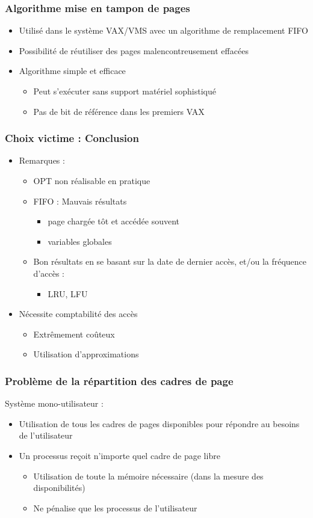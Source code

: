 \begin{frame}
\frametitle{Algorithme mise en tampon de pages}
\begin{itemize}
\item Utilisé dans le système VAX/VMS avec un algorithme de remplacement FIFO
\item Possibilité de réutiliser des pages malencontreusement effacées
\item Algorithme simple et efficace
\begin{itemize}
\item Peut s'exécuter sans support matériel sophistiqué
\item Pas de bit de référence dans les premiers VAX
\end{itemize}
\end{itemize}
\end{frame}

\begin{frame}
\frametitle{Choix victime : Conclusion}
\begin{itemize}
\item Remarques :
\begin{itemize}
\item OPT non réalisable en pratique
\item FIFO : Mauvais résultats
\begin{itemize}
\item page chargée tôt et accédée souvent
\item variables globales
\end{itemize}

\item Bon résultats en se basant sur la date de dernier accès, et/ou la fréquence d'accès :
\begin{itemize}
\item LRU, LFU
\end{itemize}
\end{itemize}
\item Nécessite comptabilité des accès
\begin{itemize}
\item Extrêmement coûteux
\item Utilisation d'approximations
\end{itemize}
\end{itemize}
\end{frame}


\begin{frame}
\frametitle{Problème de la répartition des cadres de page}
Système mono-utilisateur :
\begin{itemize}
\item Utilisation de tous les cadres de pages disponibles pour répondre au besoins de l'utilisateur
\item Un processus reçoit n'importe quel cadre de page libre
\begin{itemize}
\item Utilisation de toute la mémoire nécessaire (dans la mesure des disponibilités)
\item Ne pénalise que les processus de l'utilisateur
\end{itemize}
\end{itemize}
\end{frame}


